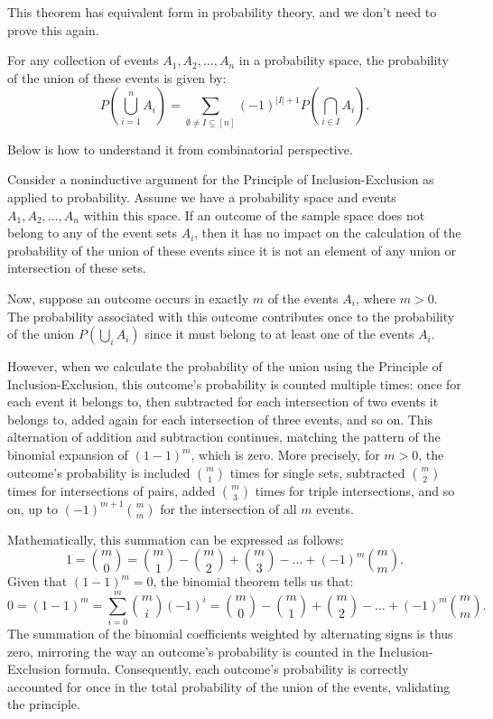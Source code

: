     This theorem has equivalent form in probability theory, and we don't need to prove this again.
    \begin{theorem}
        For any collection of events \( A_1, A_2, \ldots, A_n \) in a probability space, the probability of the union of these events is given by:
        \begin{equation}
        P\left(\bigcup_{i=1}^{n} A_i\right) = \sum_{\emptyset \neq I \subseteq [n]} (-1)^{|I|+1} P\left(\bigcap_{i \in I} A_i\right).
        \end{equation}
    \end{theorem}
    Below is how to understand it from combinatorial perspective.
    
        Consider a noninductive argument for the Principle of Inclusion-Exclusion as applied to probability. Assume we have a probability space and events \(A_1, A_2, \ldots, A_n\) within this space. If an outcome of the sample space does not belong to any of the event sets \(A_i\), then it has no impact on the calculation of the probability of the union of these events since it is not an element of any union or intersection of these sets.
        
        Now, suppose an outcome occurs in exactly \(m\) of the events \(A_i\), where \(m > 0\). The probability associated with this outcome contributes once to the probability of the union \(P(\bigcup_{i} A_i)\) since it must belong to at least one of the events \(A_i\).
        
        However, when we calculate the probability of the union using the Principle of Inclusion-Exclusion, this outcome's probability is counted multiple times: once for each event it belongs to, then subtracted for each intersection of two events it belongs to, added again for each intersection of three events, and so on. This alternation of addition and subtraction continues, matching the pattern of the binomial expansion of \((1 - 1)^m\), which is zero. More precisely, for \(m > 0\), the outcome's probability is included \( \binom{m}{1} \) times for single sets, subtracted \( \binom{m}{2} \) times for intersections of pairs, added \( \binom{m}{3} \) times for triple intersections, and so on, up to \( (-1)^{m+1}\binom{m}{m} \) for the intersection of all \(m\) events.
        
        Mathematically, this summation can be expressed as follows:
        \[
        1 = \binom{m}{0} = \binom{m}{1} - \binom{m}{2} + \binom{m}{3} - \ldots + (-1)^m\binom{m}{m}.
        \]
        Given that \( (1 - 1)^m = 0 \), the binomial theorem tells us that:
        \[
        0 = (1 - 1)^m = \sum_{i=0}^{m} \binom{m}{i}(-1)^i = \binom{m}{0} - \binom{m}{1} + \binom{m}{2} - \ldots + (-1)^m\binom{m}{m}.
        \]
        The summation of the binomial coefficients weighted by alternating signs is thus zero, mirroring the way an outcome's probability is counted in the Inclusion-Exclusion formula. Consequently, each outcome's probability is correctly accounted for once in the total probability of the union of the events, validating the principle.
    

